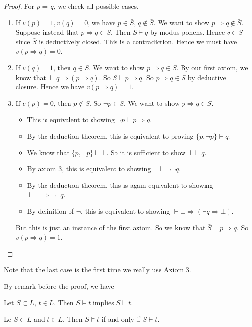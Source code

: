 \documentclass[a4paper]{article}
\begin{document}
\begin{proof}
  For $p\Rightarrow q$, we check all possible cases.
  \begin{enumerate}
    \item If $v(p) = 1, v(q) = 0$, we have $p\in \bar S$, $q\not\in \bar S$. We want to show $p\Rightarrow q\not\in \bar S$. Suppose instead that $p\Rightarrow q\in \bar S$. Then $\bar S \vdash q$ by modus ponens. Hence $q\in \bar S$ since $\bar S$ is deductively closed. This is a contradiction. Hence we must have $v(p\Rightarrow q) = 0$.
    \item If $v(q) = 1$, then $q\in \bar S$. We want to show $p\Rightarrow q\in \bar S$. By our first axiom, we know that $\vdash q\Rightarrow (p\Rightarrow q)$. So $\bar S \vdash p\Rightarrow q$. So $p\Rightarrow q \in \bar S$ by deductive closure. Hence we have $v(p \Rightarrow q) = 1$.
    \item If $v(p) = 0$, then $p\not\in \bar S$. So $\neg p\in \bar S$. We want to show $p\Rightarrow q\in \bar S$.
      \begin{itemize}
        \item
          This is equivalent to showing $\neg p \vdash p\Rightarrow q$.
        \item By the deduction theorem, this is equivalent to proving $\{p, \neg p\} \vdash q$.
        \item We know that $\{p, \neg p\} \vdash \bot$. So it is sufficient to show $\bot \vdash q$.
        \item By axiom 3, this is equivalent to showing $\bot \vdash \neg \neg q$.
        \item By the deduction theorem, this is again equivalent to showing $\vdash \bot \Rightarrow \neg \neg q$.
        \item By definition of $\neg$, this is equivalent to showing $\vdash \bot \Rightarrow (\neg q\Rightarrow \bot)$.
      \end{itemize}
      But this is just an instance of the first axiom. So we know that $\bar S\vdash p\Rightarrow q$. So $v(p\Rightarrow q) = 1$.\qedhere
  \end{enumerate}
\end{proof}
Note that the last case is the first time we really use Axiom 3.

By remark before the proof, we have
\begin{cor}
  Let $S\subset L$, $t\in L$. Then $S\models t$ implies $S\vdash t$.
\end{cor}

\begin{thm}
  Le $S\subset L$ and $t\in L$. Then $S\models t$ if and only if $S\vdash t$.
\end{thm}
\end{document}
